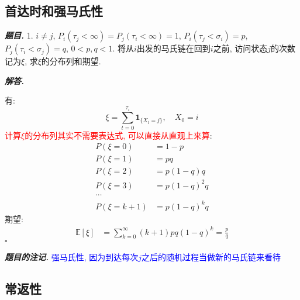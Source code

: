 \documentclass[10pt, a4paper, oneside]{ctexart}
\newenvironment{problem}{\begin{framed}\par\noindent\textbf{\textit{题目. }}}{\end{framed}\par}
\newenvironment{solution}{%
  \par\noindent\textbf{\textit{解答. }}\ignorespaces
}{%
  \hfill\ensuremath{\square}\par %
}
\newenvironment{note}{\par\noindent\textbf{\textit{题目的注记. }}\ignorespaces}{\par}
\begin{document}
\subsection{首达时和强马氏性}

\begin{problem}
    1. $i\neq j$, $P_i(\tau_j<\infty)=P_j(\tau_i<\infty)=1$, $P_i(\tau_j<\sigma_i)=p$, $P_j(\tau_i<\sigma_j)=q$, $0<p,q<1$. 将从$i$出发的马氏链在回到$i$之前, 访问状态$j$的次数记为$\xi$, 求$\xi$的分布列和期望.
\end{problem}
\begin{solution}
有:
$$\xi = \sum_{t=0}^{\tau_i} \mathbf{1}_{\{X_t=j\}}, \quad X_0=i$$
\textcolor{red}{计算$\xi$的分布列其实不需要表达式, 可以直接从直观上来算}:
\begin{align*}
    P(\xi=0)&=1-p\\
    P(\xi=1)&=pq\\
    P(\xi=2)&=p(1-q)q\\
    P(\xi=3)&=p(1-q)^2q\\
    \cdots&\\
    P(\xi=k+1)&=p(1-q)^kq
\end{align*}
期望:
\begin{align*}
    \mathbb{E}[\xi]&=\sum_{k=0}^{\infty} (k+1)pq(1-q)^k=\frac{p}{q}
\end{align*}
\end{solution}
\begin{note}
\textcolor{blue}{强马氏性, 因为到达每次$j$之后的随机过程当做新的马氏链来看待}
\end{note}

\subsection{常返性}
\end{document}
